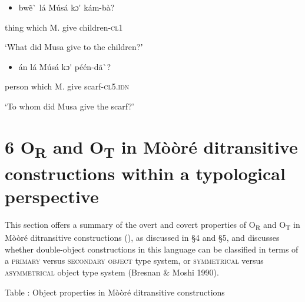 \documentclass[output=paper]{langsci/langscibook}
\begin{document}
{{{{{{{\begin{itemize}
\item \begin{styleNumberedEX}
bw\~{e}\`{ }    l\'{a}    M\'{u}s\'{a}  kɔ\'{ }  k\'{a}m-b\`{a}?
\end{styleNumberedEX}\end{itemize}
\begin{styleGloss}
thing    which    M.  give  children-\textsc{cl1}
\end{styleGloss}

\begin{styleTranslation}
‘What did Musa give to the children?ʼ
\end{styleTranslation}

\begin{itemize}
\item \begin{styleNumberedEX}
\'{a}n    l\'{a}    M\'{u}s\'{a}  kɔ\'{ }  p\'{e}\'{e}n-d\~{a}\`{ }?
\end{styleNumberedEX}\end{itemize}
\begin{styleGloss}
person  which    M.  give  scarf-\textsc{cl5.idn}
\end{styleGloss}

\begin{styleTranslation}
‘To whom did Musa give the scarf?’
\end{styleTranslation}

\chapter[6 OR and OT in Mo\`{ }o\`{ }re\'{ } ditransitive constructions within a typological perspective]{6 O\textsubscript{R} and O\textsubscript{T} in M\`{o}\`{o}r\'{e} ditransitive constructions within a typological perspective}

This section offers a summary of the overt and covert properties of O\textsubscript{R} and O\textsubscript{T} in M\`{o}\`{o}r\'{e} ditransitive constructions (), as discussed in §4 and §5, and discusses whether double-object constructions in this language can be classified in terms of a \textsc{primary} versus \textsc{secondary object }\citep{Dryer1986} type system, or \textsc{symmetrical} versus \textsc{asymmetrical} object type system (Bresnan \& Moshi 1990).

\begin{styleTabellenberschrift}
\label{bkm:Ref444780947}Table : Object properties in M\`{o}\`{o}r\'{e} ditransitive constructions
\end{styleTabellenberschrift}

}}}}}}}
\end{document}
